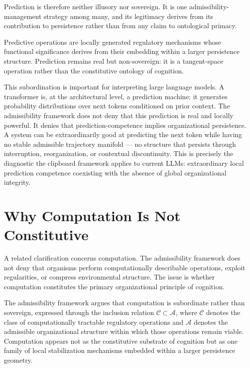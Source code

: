 \documentclass[12pt,oneside]{book}
\newcounter{thesisctr}
\newenvironment{thesis}[1][]{%
  \refstepcounter{thesisctr}%
  \begin{tcolorbox}[
    enhanced,
    breakable,
    colback=cliplight,
    colframe=clipblue,
    fonttitle=\bfseries\small,
    title={Thesis~\thethesisctr\ifx&#1&\else~(#1)\fi},
    left=6pt, right=6pt, top=4pt, bottom=4pt,
    arc=2pt
  ]
}{%
  \end{tcolorbox}
}
\theoremstyle{plain}
\theoremstyle{definition}
\theoremstyle{plain}
\begin{document}
Prediction is therefore neither illusory nor sovereign. It is one admissibility-management strategy among many, and its legitimacy derives from its contribution to persistence rather than from any claim to ontological primacy.

\begin{thesis}[Prediction as Subordinate]
Predictive operations are locally generated regulatory mechanisms whose functional significance derives from their embedding within a larger persistence structure. Prediction remains real but non-sovereign: it is a tangent-space operation rather than the constitutive ontology of cognition.
\end{thesis}

This subordination is important for interpreting large language models. A transformer is, at the architectural level, a prediction machine: it generates probability distributions over next tokens conditioned on prior context. The admissibility framework does not deny that this prediction is real and locally powerful. It denies that prediction-competence implies organizational persistence. A system can be extraordinarily good at predicting the next token while having no stable admissible trajectory manifold — no structure that persists through interruption, reorganization, or contextual discontinuity. This is precisely the diagnostic the clipboard framework applies to current LLMs: extraordinary local prediction competence coexisting with the absence of global organizational integrity.

\section{Why Computation Is Not Constitutive}

A related clarification concerns computation. The admissibility framework does not deny that organisms perform computationally describable operations, exploit regularities, or compress environmental structure. The issue is whether computation constitutes the primary organizational principle of cognition.

The admissibility framework argues that computation is subordinate rather than sovereign, expressed through the inclusion relation $\mathcal{C} \subset \mathcal{A}$, where $\mathcal{C}$ denotes the class of computationally tractable regulatory operations and $\mathcal{A}$ denotes the admissible organizational structure within which those operations remain viable. Computation appears not as the constitutive substrate of cognition but as one family of local stabilization mechanisms embedded within a larger persistence geometry.
\end{document}
